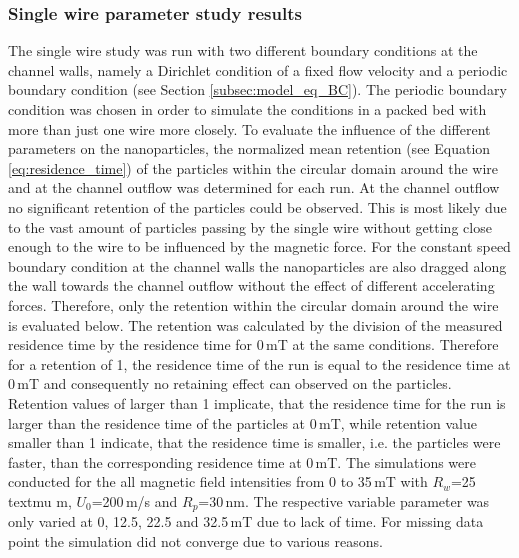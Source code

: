 \subsubsection{Single wire parameter study results}
\label{subsubsec:One_wire}

The single wire study was run with two different boundary conditions at the channel walls, namely a Dirichlet condition of a fixed flow velocity and a periodic boundary condition (see Section \ref{subsec:model_eq_BC}). The periodic boundary condition was chosen in order to simulate the conditions in a packed bed with more than just one wire more closely. To evaluate the influence of the different parameters on the nanoparticles, the normalized mean retention (see Equation\,\ref{eq:residence_time}) of the particles within the circular domain around the wire and at the channel outflow  was determined for each run. At the channel outflow no significant retention of the particles could be observed. This is most likely due to the vast amount of particles passing by the single wire without getting close enough to the wire to be influenced by the magnetic force. For the constant speed boundary condition at the channel walls the nanoparticles are also dragged along the wall towards the channel outflow without the effect of different accelerating forces. Therefore, only the retention within the circular domain around the wire is evaluated below. The retention was calculated by the division of the measured residence time by the residence time for 0\,mT at the same conditions. Therefore for a retention of 1, the residence time of the run is equal to the residence time at 0\,mT and consequently no retaining effect can observed on the particles. Retention values of larger than 1 implicate, that the residence time for the run is larger than the residence time of the particles at 0\,mT, while retention value smaller than 1 indicate, that the residence time is smaller, i.e. the particles were faster, than the corresponding residence time at 0\,mT. The simulations were conducted for the all magnetic field intensities from 0 to 35\,mT with $R_{w}$=25\,textmu m, $U_{0}$=200\,\textmu m/s and $R_{p}$=30\,nm. The respective variable parameter was only varied at 0, 12.5, 22.5 and 32.5\,mT due to lack of time. For missing data point the simulation did not converge due to various reasons.
  
